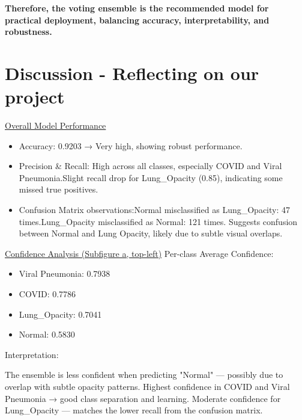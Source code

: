 \documentclass{article}
\begin{document}
\noindent
\textbf{Therefore, the voting ensemble is the recommended model for practical deployment, balancing accuracy, interpretability, and robustness.}






\section{Discussion - Reflecting on our project}

\underline{ Overall Model Performance }
\begin{itemize}
    \item Accuracy: 0.9203 → Very high, showing robust performance.
    \item Precision \& Recall: High across all classes, especially COVID and Viral Pneumonia.Slight recall drop for Lung\_Opacity (0.85), indicating some missed true positives.
    \item Confusion Matrix observations:Normal misclassified as Lung\_Opacity: 47 times.Lung\_Opacity misclassified as Normal: 121 times. Suggests confusion between Normal and Lung Opacity, likely due to subtle visual overlaps.
\end{itemize}

\underline{Confidence Analysis (Subfigure a, top-left)}
Per-class Average Confidence:
\begin{itemize}
    \item Viral Pneumonia: 0.7938
    \item COVID: 0.7786
    \item Lung\_Opacity: 0.7041
    \item Normal: 0.5830
\end{itemize}

Interpretation:

The ensemble is less confident when predicting "Normal" — possibly due to overlap with subtle opacity patterns.
Highest confidence in COVID and Viral Pneumonia → good class separation and learning.
Moderate confidence for Lung\_Opacity — matches the lower recall from the confusion matrix.
\end{document}
